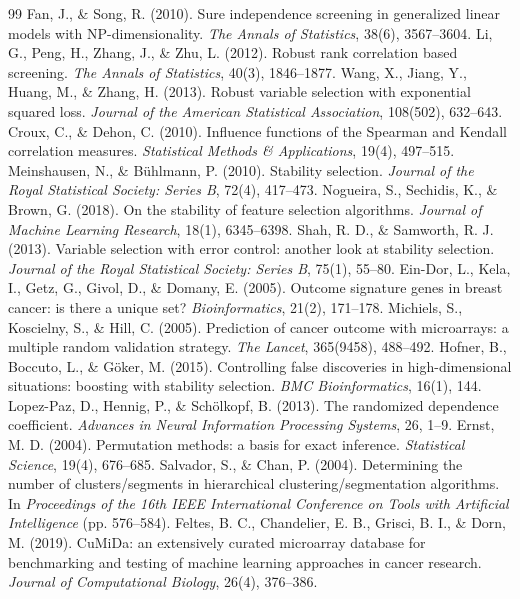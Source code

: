 \documentclass[11pt]{article}
\begin{document}
\begin{thebibliography}{99}
 Fan, J., \& Song, R. (2010). Sure independence screening in generalized linear models with NP-dimensionality. \textit{The Annals of Statistics}, 38(6), 3567--3604.
 Li, G., Peng, H., Zhang, J., \& Zhu, L. (2012). Robust rank correlation based screening. \textit{The Annals of Statistics}, 40(3), 1846--1877.
 Wang, X., Jiang, Y., Huang, M., \& Zhang, H. (2013). Robust variable selection with exponential squared loss. \textit{Journal of the American Statistical Association}, 108(502), 632--643.
 Croux, C., \& Dehon, C. (2010). Influence functions of the Spearman and Kendall correlation measures. \textit{Statistical Methods \& Applications}, 19(4), 497--515.
 Meinshausen, N., \& B\"uhlmann, P. (2010). Stability selection. \textit{Journal of the Royal Statistical Society: Series B}, 72(4), 417--473.
 Nogueira, S., Sechidis, K., \& Brown, G. (2018). On the stability of feature selection algorithms. \textit{Journal of Machine Learning Research}, 18(1), 6345--6398.
 Shah, R. D., \& Samworth, R. J. (2013). Variable selection with error control: another look at stability selection. \textit{Journal of the Royal Statistical Society: Series B}, 75(1), 55--80.
 Ein-Dor, L., Kela, I., Getz, G., Givol, D., \& Domany, E. (2005). Outcome signature genes in breast cancer: is there a unique set? \textit{Bioinformatics}, 21(2), 171--178.
 Michiels, S., Koscielny, S., \& Hill, C. (2005). Prediction of cancer outcome with microarrays: a multiple random validation strategy. \textit{The Lancet}, 365(9458), 488--492.
 Hofner, B., Boccuto, L., \& G\"oker, M. (2015). Controlling false discoveries in high-dimensional situations: boosting with stability selection. \textit{BMC Bioinformatics}, 16(1), 144.
 Lopez-Paz, D., Hennig, P., \& Sch\"olkopf, B. (2013). The randomized dependence coefficient. \textit{Advances in Neural Information Processing Systems}, 26, 1--9.
 Ernst, M. D. (2004). Permutation methods: a basis for exact inference. \textit{Statistical Science}, 19(4), 676--685.
 Salvador, S., \& Chan, P. (2004). Determining the number of clusters/segments in hierarchical clustering/segmentation algorithms. In \textit{Proceedings of the 16th IEEE International Conference on Tools with Artificial Intelligence} (pp. 576--584).
 Feltes, B. C., Chandelier, E. B., Grisci, B. I., \& Dorn, M. (2019). CuMiDa: an extensively curated microarray database for benchmarking and testing of machine learning approaches in cancer research. \textit{Journal of Computational Biology}, 26(4), 376--386.

\end{thebibliography}
\end{document}
